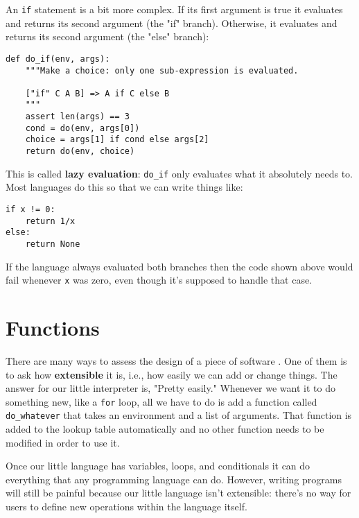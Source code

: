 \documentclass{scrbook}
\newcommand{\glossref}[1]{\textbf{#1}}
\begin{document}
An \texttt{if} statement is a bit more complex.
If its first argument is true it evaluates and returns its second argument
(the "if" branch).
Otherwise,
it evaluates and returns its second argument (the "else" branch):


\begin{lstlisting}[frame=single,frameround=tttt]
def do_if(env, args):
    """Make a choice: only one sub-expression is evaluated.

    ["if" C A B] => A if C else B
    """
    assert len(args) == 3
    cond = do(env, args[0])
    choice = args[1] if cond else args[2]
    return do(env, choice)
\end{lstlisting}



\noindent This is called \glossref{lazy evaluation}:
\texttt{do\_if} only evaluates what it absolutely needs to.
Most languages do this so that we can write things like:

\begin{lstlisting}[frame=single,frameround=tttt]
if x != 0:
    return 1/x
else:
    return None
\end{lstlisting}


\noindent If the language always evaluated both branches
then the code shown above would fail whenever \texttt{x} was zero,
even though it's supposed to handle that case.

\section{Functions}\label{interpreter-functions}


There are many ways to assess the design of a piece of software \cite{Wilson2022}.
One of them is to ask how \glossref{extensible} it is,
i.e.,
how easily we can add or change things.
The answer for our little interpreter is, "Pretty easily."
Whenever we want it to do something new,
like a \texttt{for} loop,
all we have to do is add a function called \texttt{do\_whatever}
that takes an environment and a list of arguments.
That function is added to the lookup table automatically
and no other function needs to be modified in order to use it.


Once our little language has variables, loops, and conditionals
it can do everything that any programming language can do.
However,
writing programs will still be painful
because our little language isn't extensible:
there's no way for users to define new operations within the language itself.
\end{document}
